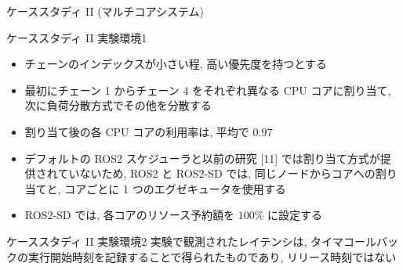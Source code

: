 \begin{frame}{ケーススタディ II (マルチコアシステム)}
\end{frame}

\begin{frame}{ケーススタディ II 実験環境1}
    \begin{itemize}
        \item チェーンのインデックスが小さい程, 高い優先度を持つとする
        \item 最初にチェーン 1 からチェーン 4 をそれぞれ異なる CPU コアに割り当て, 次に負荷分散方式でその他を分散する
        \item 割り当て後の各 CPU コアの利用率は, 平均で $0.97$
        \item デフォルトの ROS2 スケジューラと以前の研究 [11] では割り当て方式が提供されていないため, ROS2 と ROS2-SD では, 同じノードからコアへの割り当てと, コアごとに 1 つのエグゼキュータを使用する
        \item ROS2-SD では, 各コアのリソース予約額を $100 \%$ に設定する
    \end{itemize}
\end{frame}

\begin{frame}[label=latency]{ケーススタディ II 実験環境2}
    実験で観測されたレイテンシは, タイマコールバックの実行開始時刻を記録することで得られたものであり, リリース時刻ではない
\end{frame}

